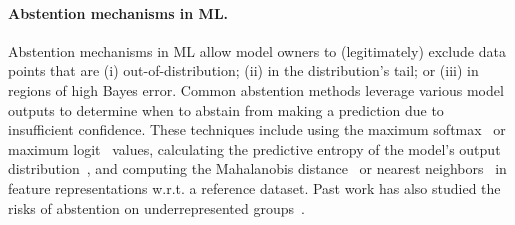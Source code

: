 \paragraph{Abstention mechanisms in ML.}
Abstention mechanisms in ML allow model owners to (legitimately) exclude data points that are (i) out-of-distribution; (ii) in the distribution's tail; or (iii) in regions of high Bayes error. Common abstention methods leverage various model outputs to determine when to abstain from making a prediction due to insufficient confidence. These techniques include using the maximum softmax~\citep{hendrycks2016baseline} or maximum logit~\citep{hendrycks2019scaling} values, calculating the predictive entropy of the model's output distribution~\citep{lakshminarayanan2017simple}, and computing the Mahalanobis distance~\citep{lee2018simple, ren2021simple} or nearest neighbors~\citep{raghuram2021general, dziedzic2022p, sun2022out} in feature representations w.r.t. a reference dataset. Past work has also studied the risks of abstention on underrepresented groups~\citep{jones2020selective}.





